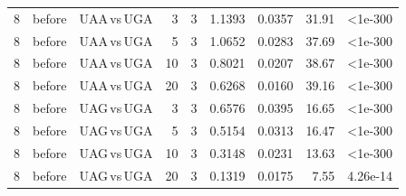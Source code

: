\begin{longtable}{rrlrlrrrr}
8 & before & UAA$\,$vs$\,$UGA & 3 & 3 & 1.1393 & 0.0357 & 31.91 & <1e-300 \\
8 & before & UAA$\,$vs$\,$UGA & 5 & 3 & 1.0652 & 0.0283 & 37.69 & <1e-300 \\
8 & before & UAA$\,$vs$\,$UGA & 10 & 3 & 0.8021 & 0.0207 & 38.67 & <1e-300 \\
8 & before & UAA$\,$vs$\,$UGA & 20 & 3 & 0.6268 & 0.0160 & 39.16 & <1e-300 \\
8 & before & UAG$\,$vs$\,$UGA & 3 & 3 & 0.6576 & 0.0395 & 16.65 & <1e-300 \\
8 & before & UAG$\,$vs$\,$UGA & 5 & 3 & 0.5154 & 0.0313 & 16.47 & <1e-300 \\
8 & before & UAG$\,$vs$\,$UGA & 10 & 3 & 0.3148 & 0.0231 & 13.63 & <1e-300 \\
8 & before & UAG$\,$vs$\,$UGA & 20 & 3 & 0.1319 & 0.0175 & 7.55 & 4.26e-14 \\
\bottomrule
\end{longtable}
\endgroup

